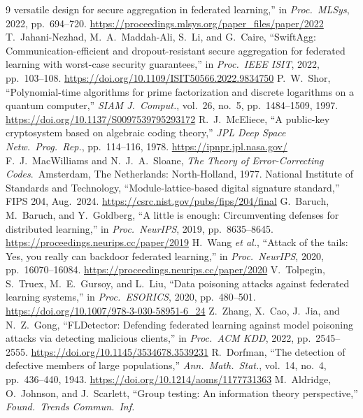 \documentclass[lettersize,journal]{IEEEtran}
\begin{document}
\begin{thebibliography}{9}
versatile design for secure aggregation in federated learning,'' in
\emph{Proc.\ MLSys}, 2022, pp.\ 694--720. \url{https://proceedings.mlsys.org/paper_files/paper/2022}
 T.\ Jahani-Nezhad, M.\ A.\ Maddah-Ali, S.\ Li, and G.\ Caire,
``SwiftAgg: Communication-efficient and dropout-resistant secure aggregation for
federated learning with worst-case security guarantees,'' in \emph{Proc.\ IEEE
ISIT}, 2022, pp.\ 103--108. \url{https://doi.org/10.1109/ISIT50566.2022.9834750}
 P.\ W.\ Shor, ``Polynomial-time algorithms for prime
factorization and discrete logarithms on a quantum computer,'' \emph{SIAM
J.\ Comput.}, vol.\ 26, no.\ 5, pp.\ 1484--1509, 1997. \url{https://doi.org/10.1137/S0097539795293172}
 R.\ J.\ McEliece, ``A public-key cryptosystem based on
algebraic coding theory,'' \emph{JPL Deep Space Netw.\ Prog.\ Rep.}, pp.\ 114--116,
1978. \url{https://ipnpr.jpl.nasa.gov/}
 F.\ J.\ MacWilliams and N.\ J.\ A.\ Sloane, \emph{The
Theory of Error-Correcting Codes}.\ Amsterdam, The Netherlands: North-Holland,
1977.
 National Institute of Standards and Technology,
``Module-lattice-based digital signature standard,'' FIPS 204, Aug.\ 2024. \url{https://csrc.nist.gov/pubs/fips/204/final}
 G.\ Baruch, M.\ Baruch, and Y.\ Goldberg, ``A little is
enough: Circumventing defenses for distributed learning,'' in \emph{Proc.\ NeurIPS},
2019, pp.\ 8635--8645. \url{https://proceedings.neurips.cc/paper/2019}
 H.\ Wang \emph{et al.}, ``Attack of the tails: Yes, you
really can backdoor federated learning,'' in \emph{Proc.\ NeurIPS}, 2020,
pp.\ 16070--16084. \url{https://proceedings.neurips.cc/paper/2020}
 V.\ Tolpegin, S.\ Truex, M.\ E.\ Gursoy, and L.\ Liu,
``Data poisoning attacks against federated learning systems,'' in \emph{Proc.\
ESORICS}, 2020, pp.\ 480--501. \url{https://doi.org/10.1007/978-3-030-58951-6_24}
\bibitem{fldetector2022} Z.\ Zhang, X.\ Cao, J.\ Jia, and N.\ Z.\ Gong,
``FLDetector: Defending federated learning against model poisoning attacks via
detecting malicious clients,'' in \emph{Proc.\ ACM KDD}, 2022, pp.\ 2545--2555. \url{https://doi.org/10.1145/3534678.3539231}
\bibitem{dorfman1943} R.\ Dorfman, ``The detection of defective members of large
populations,'' \emph{Ann.\ Math.\ Stat.}, vol.\ 14, no.\ 4, pp.\ 436--440, 1943. \url{https://doi.org/10.1214/aoms/1177731363}
\bibitem{aldridge2019} M.\ Aldridge, O.\ Johnson, and J.\ Scarlett, ``Group
testing: An information theory perspective,'' \emph{Found.\ Trends Commun.\ Inf.\
}
\end{thebibliography}
\end{document}
